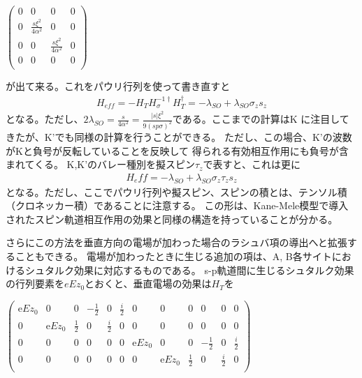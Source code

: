 \documentclass{article}
\begin{document}
\begin{doublespace}
\noindent\(\left(
\begin{array}{cccc}
 0 & 0 & 0 & 0 \\
 0 & \frac{s \xi^2}{4 \alpha ^2} & 0 & 0 \\
 0 & 0 & \frac{s \xi^2}{4 \alpha ^2} & 0 \\
 0 & 0 & 0 & 0 \\
\end{array}
\right)\)
\end{doublespace}

が出て来る。これをパウリ行列を使って書き直すと
\begin{eqnarray}
H_{eff}=-H_T
H_\sigma^{-1\dagger}H_T^\dagger = -\lambda_{SO}+\lambda_{SO} \sigma_z s_z
\end{eqnarray}
となる。ただし、$2\lambda_{SO}=\frac{s}{4 \alpha
^2}=\frac{|s|
\xi^2}{9(sp\sigma)^2}$である。ここまでの計算はK
に注目してきたが、K'でも同様の計算を行うことができる。
ただし、この場合、K'の波数がKと負号が反転していることを反映して
得られる有効相互作用にも負号が含まれてくる。
K,K'のバレー種別を擬スピン$\tau_z$で表すと、これは更に
\begin{eqnarray}
H_eff= -\lambda_{SO}+\lambda_{SO} \sigma_z \tau_z s_z
\end{eqnarray}
となる。ただし、ここでパウリ行列や擬スピン、スピンの積とは、テンソル積（クロネッカー積）であることに注意する。
この形は、Kane-Mele模型\cite{Kane1}で導入されたスピン軌道相互作用の効果と同様の構造を持っていることが分かる。

さらにこの方法を垂直方向の電場が加わった場合のラシュバ項の導出へと拡張することもできる。
電場が加わったときに生じる追加の項は、A, B各サイトにおけるシュタルク効果に対応するものである。
s-p軌道間に生じるシュタルク効果の行列要素を$eEz_0$とおくと、垂直電場の効果は$H_T$を

\begin{doublespace}
\noindent\(\left(
\begin{array}{cccccccccccc}
 \text{e$Ez_0$} & 0 & 0 & -\frac{1}{2} & 0 & \frac{i}{2} & 0 & 0 & 0 & 0 & 0 & 0
 \\
 0 & \text{e$Ez_0$} & \frac{1}{2} & 0 & \frac{i}{2} & 0 & 0 & 0 & 0 & 0 & 0 & 0
 \\
 0 & 0 & 0 & 0 & 0 & 0 & \text{e$Ez_0$} & 0 & 0 & -\frac{1}{2} & 0 & \frac{i}{2}
 \\
 0 & 0 & 0 & 0 & 0 & 0 & 0 & \text{e$Ez_0$} & \frac{1}{2} & 0 & \frac{i}{2} & 0
 \\
\end{array}
\right)\)
\end{doublespace}
\end{document}
